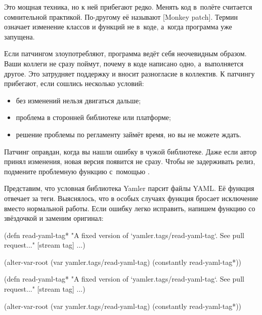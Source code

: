 
Это мощная техника, но к ней прибегают редко. Менять код в~полёте считается
сомнительной практикой. По-другому её называют
[Monkey patch].
Термин означает изменение классов и функций не в~коде, а~когда программа уже запущена.

Если патчингом злоупотребляют, программа ведёт себя неочевидным образом. Ваши
коллеги не сразу поймут, почему в коде написано одно, а~выполняется другое. Это
затрудняет поддержку и вносит разногласие в коллектив. К патчингу прибегают,
если сошлись несколько условий:

\begin{itemize}

\item
  без изменений нельзя двигаться дальше;

\item
  проблема в сторонней библиотеке или платформе;

\item
  решение проблемы по регламенту займёт время, но вы не можете ждать.

\end{itemize}

Патчинг оправдан, когда вы нашли ошибку в чужой библиотеке. Даже если автор
принял изменения, новая версия появится не сразу. Чтобы не задерживать релиз,
подмените проблемную функцию с~помощью .

Представим, что условная библиотека Yamler парсит файлы YAML. Её функция
 отвечает за теги. Выяснялось, что в особых случаях функция
бросает исключение вместо нормальной работы. Если ошибку легко исправить,
напишем функцию со звёздочкой и заменим оригинал:

\pagebreakafive

\ifnarrow

\begin{clojure}
(defn read-yaml-tag*
  "A fixed version of
   `yamler.tags/read-yaml-tag`.
   See pull request..."
  [stream tag]
  ...)

(alter-var-root
 (var yamler.tags/read-yaml-tag)
 (constantly read-yaml-tag*))
\end{clojure}

\else

\begin{clojure}
(defn read-yaml-tag*
  "A fixed version of `yamler.tags/read-yaml-tag`.
   See pull request..."
  [stream tag]
  ...)

(alter-var-root
 (var yamler.tags/read-yaml-tag)
 (constantly read-yaml-tag*))
\end{clojure}

